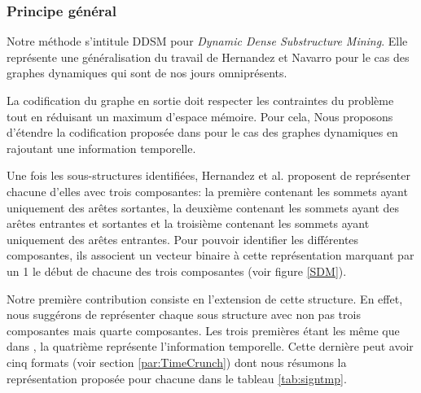 		\subsubsection{Principe général}
			Notre méthode s'intitule DDSM pour \textit{Dynamic Dense Substructure Mining}. Elle représente une généralisation du travail de Hernandez et Navarro \citep{hernandez2014compressed} pour le cas des graphes dynamiques qui sont de nos jours omniprésents.
			
			
			La codification du graphe en sortie doit respecter les contraintes du problème tout en réduisant un maximum d'espace mémoire. Pour cela, Nous proposons d'étendre la codification proposée dans \citep{hernandez2014compressed} pour le cas des graphes dynamiques en rajoutant une information temporelle. 
			
			Une fois les sous-structures identifiées, Hernandez et al. \citep{hernandez2014compressed} proposent de représenter chacune d'elles avec trois composantes: la première contenant les sommets ayant uniquement des arêtes sortantes, la deuxième contenant les sommets ayant des arêtes entrantes et sortantes et la troisième contenant les sommets ayant uniquement des arêtes entrantes. Pour pouvoir identifier les différentes composantes, ils associent un vecteur binaire à cette représentation marquant par un 1 le début de chacune des trois composantes (voir figure \ref{SDM}).
			
			Notre première contribution consiste en l'extension de cette structure. En effet, nous suggérons de représenter chaque sous structure avec non pas trois composantes mais quarte composantes. Les trois premières étant les même que dans \citep{hernandez2014compressed}, la quatrième représente l'information temporelle. Cette dernière peut avoir cinq formats (voir section \ref{par:TimeCrunch}) dont nous résumons la représentation proposée pour chacune dans le tableau \ref{tab:signtmp}.
			
